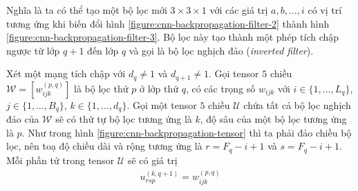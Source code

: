 Nghĩa là ta có thể tạo một bộ lọc mới $3\times 3\times 1$ với các giá trị $a,b,\dots,i$ có vị trí tương ứng khi biến đổi hình \ref{figure:cnn-backpropagation-filter-2} thành hình \ref{figure:cnn-backpropagation-filter-3}. Bộ lọc này tạo thành một phép tích chập ngược từ lớp $q+1$ đến lớp $q$ và gọi là bộ lọc nghịch đảo (\textit{inverted filter}).

Xét một mạng tích chập với $d_q\neq 1$ và $d_{q+1}\neq 1$. Gọi tensor $5$ chiều $\mathcal W=[w_{ijk}^{(p,q)}]$ là bộ lọc thứ $p$ ở lớp thứ $q$, có các trọng số $w_{ijk}$ với $i\in\{1,\dots,L_q\}$, $j\in\{1,\dots,B_q\}$, $k\in\{1,\dots,d_q\}$. Gọi một tensor $5$ chiều $\mathcal U$ chứa tất cả bộ lọc nghịch đảo của $\mathcal W$ sẽ có thứ tự bộ lọc tương ứng là $k$, độ sâu của một bộ lọc tương ứng là $p$. Như trong hình \ref{figure:cnn-backpropagation-tensor} thì ta phải đảo chiều bộ lọc, nên toạ độ chiều dài và rộng tương ứng là $r=F_q-i+1$ và $s=F_q-i+1$. Mỗi phần tử trong tensor $\mathcal U$ sẽ có giá trị \cite{Aggarwal2023}
\begin{align}
    u_{rsp}^{(k,q+1)}=w_{ijk}^{(p,q)}
\end{align}
